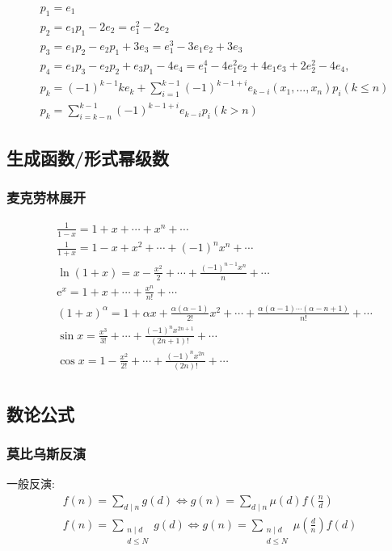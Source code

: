 \begin{equation*}
    \begin{aligned}
        &p_1=e_1 \\
        &p_2=e_1 p_1-2 e_2=e_1^2-2 e_2 \\
        &p_3=e_1 p_2-e_2 p_1+3 e_3=e_1^3-3 e_1 e_2+3 e_3 \\
        &p_4=e_1 p_3-e_2 p_2+e_3 p_1-4 e_4=e_1^4-4 e_1^2 e_2+4 e_1 e_3+2 e_2^2-4 e_4,\\
        &p_k=(-1)^{k-1} k e_k+\sum_{i=1}^{k-1}(-1)^{k-1+i} e_{k-i}\left(x_1, \ldots, x_n\right) p_i (k\le n)\\
        &p_k=\sum_{i=k-n}^{k-1}(-1)^{k-1+i} e_{k-i} p_i (k>n)
    \end{aligned}
\end{equation*}




\subsection{生成函数/形式幂级数}
\subsubsection{麦克劳林展开}
\begin{equation*}
    \begin{aligned}
        &\frac{1}{1-x}=1+x+\cdots+x^n+\cdots\\
        &\frac{1}{1+x}=1-x+x^2+\cdots+(-1)^n x^n+\cdots\\
        &\ln (1+x)=x-\frac{x^2}{2}+\cdots+\frac{(-1)^{n-1} x^n}{n}+\cdots\\
        &\mathrm{e}^x=1+x+\cdots+\frac{x^n}{n !}+\cdots\\
        &(1+x)^\alpha=1+\alpha x+\frac{\alpha(\alpha-1)}{2 !} x^2+\cdots+\frac{\alpha(\alpha-1)\cdots(\alpha-n+1)}{n!}+\cdots\\
        &\sin x=\frac{x^3}{3 !}+\cdots+\frac{(-1)^n x^{2 n+1}}{(2 n+1) !}+\cdots\\
        &\cos x=1-\frac{x^2}{2 !}+\cdots+\frac{(-1)^n x^{2 n}}{(2 n) !}+\cdots\\
    \end{aligned}
\end{equation*}
\subsection{数论公式}
\subsubsection{莫比乌斯反演}
一般反演:
\begin{equation*}
    \begin{aligned}
        f(n)=\sum_{d\mid n}g(d) \Longleftrightarrow g(n)=\sum_{d\mid n} \mu (d)f(\frac{n}{d})\\
        f(n)=\sum_{\substack{n\mid d\\ d\le N}}g(d) \Longleftrightarrow g(n)=\sum_{\substack{n\mid d\\ d\le N}} \mu (\frac{d}{n})f(d)
    \end{aligned}
\end{equation*}

